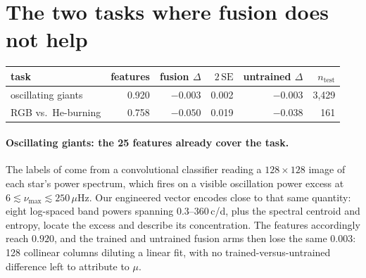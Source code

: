 \documentclass{article}
\begin{document}
\section{The two tasks where fusion does not help}
\label{app:negatives}

\begin{center}
\small
\begin{tabular}{lrrrrr}
\toprule
task & features & fusion $\Delta$ & $2\,\mathrm{SE}$ & untrained $\Delta$ & $n_{\mathrm{test}}$ \\
\midrule
oscillating giants & 0.920 & $-0.003$ & 0.002 & $-0.003$ & 3{,}429 \\
RGB vs.\ He-burning & 0.758 & $-0.050$ & 0.019 & $-0.038$ & 161 \\
\bottomrule
\end{tabular}
\end{center}

\paragraph{Oscillating giants: the 25 features already cover the task.} The labels of
\citet{hon2021} come from a convolutional classifier reading a $128 \times 128$ image of each star's
power spectrum, which fires on a visible oscillation power excess at
$6 \lesssim \nu_{\max} \lesssim 250\,\mu$Hz. Our engineered vector encodes close to that same
quantity: eight log-spaced band powers spanning 0.3--360\,c/d, plus the spectral centroid and
entropy, locate the excess and describe its concentration. The features accordingly reach $0.920$,
and the trained and untrained fusion arms then lose the same $0.003$: 128 collinear columns
diluting a linear fit, with no trained-versus-untrained difference left to attribute to $\mu$.
\end{document}
